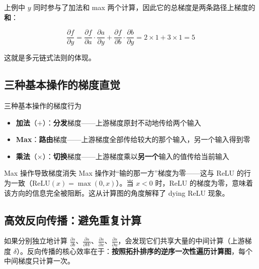 \documentclass[a4paper]{article}
\begin{document}



上例中 $y$ 同时参与了加法和 max 两个计算，因此它的总梯度是两条路径上梯度的\textbf{和}：

$$\frac{\partial f}{\partial y} = \frac{\partial f}{\partial a} \cdot \frac{\partial a}{\partial y} + \frac{\partial f}{\partial b} \cdot \frac{\partial b}{\partial y} = 2 \times 1 + 3 \times 1 = 5$$

这就是多元链式法则的体现。

\subsection{三种基本操作的梯度直觉}





\begin{importantbox}{三种基本操作的梯度行为}
\begin{itemize}
    \item \textbf{加法}（$+$）：\textbf{分发}梯度——上游梯度原封不动地传给两个输入
    \item \textbf{Max}：\textbf{路由}梯度——上游梯度全部传给较大的那个输入，另一个输入得到零
    \item \textbf{乘法}（$\times$）：\textbf{切换}梯度——上游梯度乘以\textbf{另一个}输入的值传给当前输入
\end{itemize}
\end{importantbox}

\begin{warningbox}{Max 操作导致梯度消失}
Max 操作对``输的那一方''梯度为零——这与 ReLU 的行为一致（$\text{ReLU}(x) = \max(0, x)$）。当 $x < 0$ 时，ReLU 的梯度为零，意味着该方向的信息完全被阻断。这从计算图的角度解释了 dying ReLU 现象。
\end{warningbox}

\subsection{高效反向传播：避免重复计算}





如果分别独立地计算 $\frac{\partial s}{\partial b}$、$\frac{\partial s}{\partial W}$、$\frac{\partial s}{\partial x}$、$\frac{\partial s}{\partial u}$，会发现它们共享大量的中间计算（上游梯度 $\delta$）。反向传播的核心效率在于：\textbf{按照拓扑排序的逆序一次性遍历计算图}，每个中间梯度只计算一次。
\end{document}
